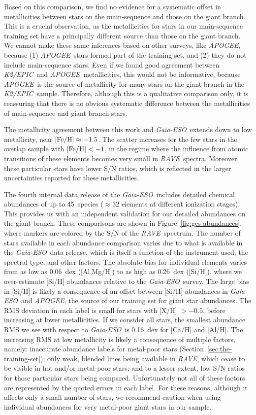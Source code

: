 \documentclass[preprint]{aastex61}
\newcommand{\acronym}[1]{{\small{#1}}}
\newcommand{\project}[1]{\textsl{#1}}
\newcommand{\rave}{\project{\acronym{RAVE}}}
\newcommand{\ges}{\project{Gaia-ESO}}
\newcommand{\apogee}{\project{\acronym{APOGEE}}}
\newcommand{\epic}{\project{K2/EPIC}}
\begin{document}
Based on this comparison, we find no evidence for a systematic offset in
metallicities between stars on the main-sequence and those on the giant branch. 
This is a crucial observation, as the metallicities for stars in our 
main-sequence training set have a principally different source than those on 
the giant branch.  We cannot make these same inferences based on other 
surveys, like \apogee, because (1) \apogee\ stars formed part of the 
training set, and (2) they do not include main-sequence stars.  Even if we 
found good agreement between \epic\ and \apogee\ metallicities, this would 
not be informative, because \apogee\ is the source of metallicity for many 
stars on the giant branch in the \epic\ sample. Therefore, although this is
a qualitative comparison only, it is reassuring that there is no obvious 
systematic difference between the metallicities of main-sequence and giant
branch stars.


The metallicity agreement between this work and \ges\ extends down to low
metallicity, near $[{\rm Fe/H}] \approx -1.5$.  The scatter increases for
the few stars in the overlap sample with $[{\rm Fe/H}] < -1$, in the regime
where the influence from atomic transitions of these elements becomes very
small in \rave\ spectra. Moreover, these particular stars have lower S/N
ratios, which is reflected in the larger uncertainties
reported for these metallicities. 


The fourth internal data release of the \ges\ includes detailed chemical
abundances of up to 45~species ($\approx32$ elements at different ionization
stages).  This provides us with an independent validation for our detailed
abundances on the giant branch.  These comparisons are shown in 
Figure~\ref{fig:ges-abundances}, where markers are colored by the
S/N of the \rave\ spectrum.  The number of stars available in each abundance
comparison varies due to what is available in the \ges\ data release, which
is itself a function of the instrument used, the spectral type, and other
factors.  The absolute bias for individual elements varies from as low as
0.06~dex ([Al,Mg/H]) to as high as 0.26~dex ([Si/H]), where we over-estimate 
[Si/H] abundances relative to the \ges\ survey.  The large bias in [Si/H]
is likely a consequence of an offset between [Si/H] abundances in \ges\ and
\apogee, the source of our training set for giant star abundances.  
The RMS deviation in each label is small for stars with [X/H] $> -0.5$, 
before increasing at lower metallicities.  If we consider all stars, the 
smallest abundance RMS we see with respect to \ges\ is 0.16~dex for [Ca/H] 
and [Al/H].  The increasing RMS at low metallicity is likely a consequence
of multiple factors, namely: inaccurate abundance labels for metal-poor stars
(Section~\ref{sec:the-training-set}); only weak, blended lines being available
in \rave, which cease to be visible in hot and/or metal-poor stars; and to a 
lesser extent, low S/N ratios for those particular stars being compared.  
Unfortunately not all of these factors are represented by the quoted errors 
in each label.  For these reasons, although it affects only a small number of
stars, we recommend caution when using individual abundances for very 
metal-poor giant stars in our sample.
\end{document}
